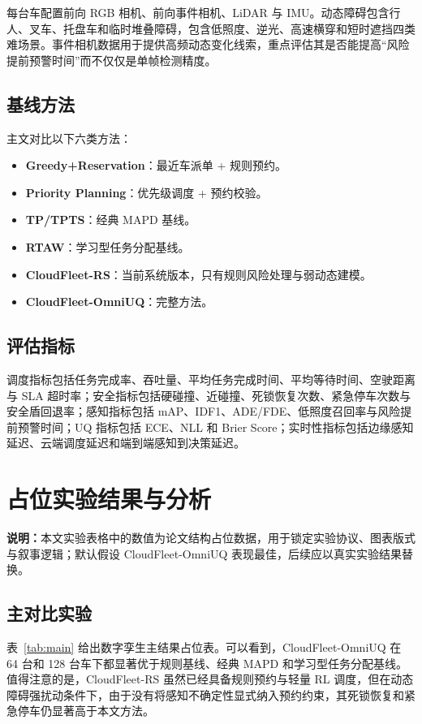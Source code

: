 \documentclass[UTF8,twocolumn,10pt]{ctexart}
\newcommand{\method}{CloudFleet-OmniUQ}
\newcommand{\baseline}{CloudFleet-RS}
\newcommand{\placeholder}{\textbf{说明：}本文实验表格中的数值为论文结构占位数据，用于锁定实验协议、图表版式与叙事逻辑；默认假设 \method{} 表现最佳，后续应以真实实验结果替换。}
\begin{document}
每台车配置前向 RGB 相机、前向事件相机、LiDAR 与 IMU。动态障碍包含行人、叉车、托盘车和临时堆叠障碍，包含低照度、逆光、高速横穿和短时遮挡四类难场景。事件相机数据用于提供高频动态变化线索，重点评估其是否能提高“风险提前预警时间”而不仅仅是单帧检测精度。

\subsection{基线方法}

主文对比以下六类方法：
\begin{itemize}
  \item \textbf{Greedy+Reservation}：最近车派单 + 规则预约。
  \item \textbf{Priority Planning}：优先级调度 + 预约校验。
  \item \textbf{TP/TPTS}：经典 MAPD 基线。
  \item \textbf{RTAW}：学习型任务分配基线。
  \item \textbf{\baseline{}}：当前系统版本，只有规则风险处理与弱动态建模。
  \item \textbf{\method{}}：完整方法。
\end{itemize}

\subsection{评估指标}

调度指标包括任务完成率、吞吐量、平均任务完成时间、平均等待时间、空驶距离与 SLA 超时率；安全指标包括硬碰撞、近碰撞、死锁恢复次数、紧急停车次数与安全盾回退率；感知指标包括 mAP、IDF1、ADE/FDE、低照度召回率与风险提前预警时间；UQ 指标包括 ECE、NLL 和 Brier Score；实时性指标包括边缘感知延迟、云端调度延迟和端到端感知到决策延迟。

\section{占位实验结果与分析}

\noindent\placeholder

\subsection{主对比实验}

表~\ref{tab:main} 给出数字孪生主结果占位表。可以看到，\method{} 在 64 台和 128 台车下都显著优于规则基线、经典 MAPD 和学习型任务分配基线。值得注意的是，\baseline{} 虽然已经具备规则预约与轻量 RL 调度，但在动态障碍强扰动条件下，由于没有将感知不确定性显式纳入预约约束，其死锁恢复和紧急停车仍显著高于本文方法。
\end{document}
